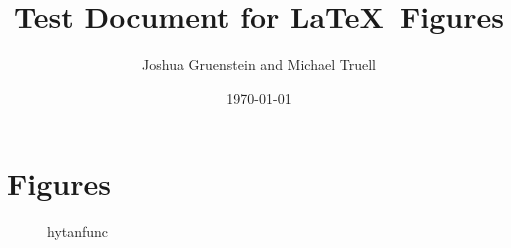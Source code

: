 \documentclass[a4paper]{article}
\title{Test Document for \LaTeX \ Figures}
\author{Joshua Gruenstein and Michael Truell}
\date{\today}
\begin{document}
\maketitle

\section{Figures}

\begin{figure} [h]
	\centering
	
	\caption{hytanfunc}
\end{figure}
\end{document}
